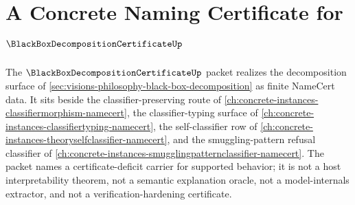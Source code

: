 \chapter{A Concrete Naming Certificate for $\BlackBoxDecompositionCertificateUp$}
\label{ch:concrete-instances-black-box-decomposition-certificate-namecert}

The $\BlackBoxDecompositionCertificateUp$ packet realizes the decomposition surface of \autoref{sec:visions-philosophy-black-box-decomposition} as finite NameCert data. It sits beside the classifier-preserving route of \autoref{ch:concrete-instances-classifiermorphism-namecert}, the classifier-typing surface of \autoref{ch:concrete-instances-classifiertyping-namecert}, the self-classifier row of \autoref{ch:concrete-instances-theoryselfclassifier-namecert}, and the smuggling-pattern refusal classifier of \autoref{ch:concrete-instances-smugglingpatternclassifier-namecert}. The packet names a certificate-deficit carrier for supported behavior; it is not a host interpretability theorem, not a semantic explanation oracle, not a model-internals extractor, and not a verification-hardening certificate.

